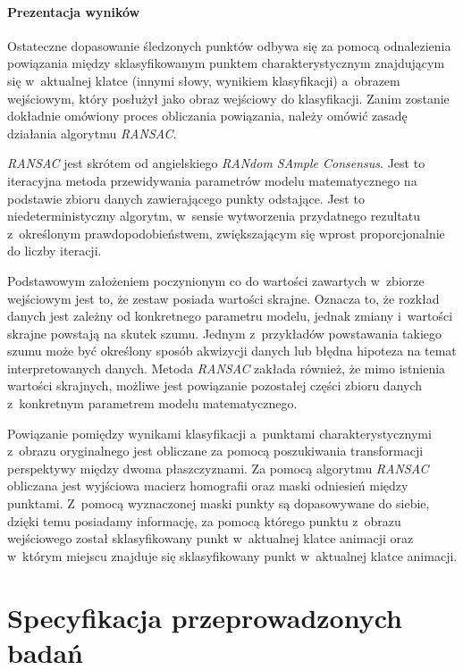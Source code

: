     \subsubsection{Prezentacja wyników}
    Ostateczne dopasowanie śledzonych punktów odbywa się za pomocą odnalezienia powiązania między sklasyfikowanym punktem charakterystycznym znajdującym się w~aktualnej klatce (innymi słowy, wynikiem klasyfikacji) a~obrazem wejściowym, który posłużył jako obraz wejściowy do klasyfikacji. Zanim zostanie dokładnie omówiony proces obliczania powiązania, należy omówić zasadę działania algorytmu \textit{RANSAC}.

    \textit{RANSAC} jest skrótem od angielskiego \textit{RANdom SAmple Consensus}. Jest to iteracyjna metoda przewidywania parametrów modelu matematycznego na podstawie zbioru danych zawierającego punkty odstające. Jest to niedeterministyczny algorytm, w~sensie wytworzenia przydatnego rezultatu z~określonym prawdopodobieństwem, zwiększającym się wprost proporcjonalnie do liczby iteracji.

    Podstawowym założeniem poczynionym co do wartości zawartych w~zbiorze wejściowym jest to, że zestaw posiada wartości skrajne. Oznacza to, że rozkład danych jest zależny od konkretnego parametru modelu, jednak zmiany i~wartości skrajne powstają na skutek szumu. Jednym z~przykładów powstawania takiego szumu może być określony sposób akwizycji danych lub błędna hipoteza na temat interpretowanych danych. Metoda \textit{RANSAC} zakłada również, że mimo istnienia wartości skrajnych, możliwe jest powiązanie pozostałej części zbioru danych z~konkretnym parametrem modelu matematycznego.

    Powiązanie pomiędzy wynikami klasyfikacji a~punktami charakterystycznymi z~obrazu oryginalnego jest obliczane za pomocą poszukiwania transformacji perspektywy między dwoma płaszczyznami. Za pomocą algorytmu \textit{RANSAC} obliczana jest wyjściowa macierz homografii oraz maski odniesień między punktami. Z~pomocą wyznaczonej maski punkty są dopasowywane do siebie, dzięki temu posiadamy informację, za pomocą którego punktu z~obrazu wejściowego został sklasyfikowany punkt w~aktualnej klatce animacji oraz w~którym miejscu znajduje się sklasyfikowany punkt w~aktualnej klatce animacji.

\chapter{Specyfikacja przeprowadzonych badań}\label{Chapter_SpecyfikacjaPrzeprowadzonychBadan}

